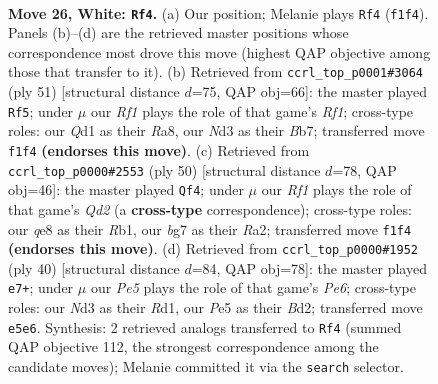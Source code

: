 \documentclass[11pt]{article}
\begin{document}
\clearpage

\begin{figure}[p]\centering
\begin{subfigure}{0.46\textwidth}\centering
\resizebox{\linewidth}{!}{%
\newchessgame
\chessboard[
  setfen={3rqr1k/6b1/1pn5/p1pBPpn1/2P4p/1P1N4/PB1P2K1/1R1Q1R2 w - - 4 26},
  showmover=false,
  pgfstyle=straightmove, color=movearrow, markmove={f1-f4}
]}
\caption{}
\end{subfigure}\hfill
\begin{subfigure}{0.46\textwidth}\centering
\resizebox{\linewidth}{!}{%
\newchessgame
\chessboard[
  setfen={r4r1k/1b2q2p/2pb2p1/3nN3/1p1PNP2/6Q1/1P1B3P/2R2RK1 b - - 2 26},
  showmover=false,
  pgfstyle=straightmove, color=movearrow, markmove={f8-f5}
]}
\caption{}
\end{subfigure}
\\[4pt]
\begin{subfigure}{0.46\textwidth}\centering
\resizebox{\linewidth}{!}{%
\newchessgame
\chessboard[
  setfen={r1rq2k1/5pp1/2bbpn1p/4B3/2PP4/p1N2P1P/R1BQ2P1/1R4K1 w - - 2 26},
  showmover=false,
  pgfstyle=straightmove, color=movearrow, markmove={d2-f4}
]}
\caption{}
\end{subfigure}\hfill
\begin{subfigure}{0.46\textwidth}\centering
\resizebox{\linewidth}{!}{%
\newchessgame
\chessboard[
  setfen={2qrr1k1/1b4p1/pp2Pn1p/2p1bQ2/P1B5/2N4P/1P1B1PP1/3R2K1 w - - 0 21},
  showmover=false,
  pgfstyle=straightmove, color=movearrow, markmove={e6-e7}
]}
\caption{}
\end{subfigure}
\caption{\textbf{Move 26, White: \texttt{Rf4}.} (a) Our position; Melanie plays \texttt{Rf4} (\texttt{f1f4}). Panels (b)--(d) are the retrieved master positions whose correspondence most drove this move (highest QAP objective among those that transfer to it). (b) Retrieved from \texttt{ccrl\_top\_p0001\#3064} (ply 51) [structural distance $d$=75, QAP obj=66]: the master played \texttt{Rf5}; under $\mu$ our \emph{Rf1} plays the role of that game's \emph{Rf1}; cross-type roles: our \emph{Q}d1 as their \emph{R}a8, our \emph{N}d3 as their \emph{B}b7; transferred move \texttt{f1f4} \textbf{(endorses this move)}. (c) Retrieved from \texttt{ccrl\_top\_p0000\#2553} (ply 50) [structural distance $d$=78, QAP obj=46]: the master played \texttt{Qf4}; under $\mu$ our \emph{Rf1} plays the role of that game's \emph{Qd2} (a \textbf{cross-type} correspondence); cross-type roles: our \emph{q}e8 as their \emph{R}b1, our \emph{b}g7 as their \emph{R}a2; transferred move \texttt{f1f4} \textbf{(endorses this move)}. (d) Retrieved from \texttt{ccrl\_top\_p0000\#1952} (ply 40) [structural distance $d$=84, QAP obj=78]: the master played \texttt{e7+}; under $\mu$ our \emph{Pe5} plays the role of that game's \emph{Pe6}; cross-type roles: our \emph{N}d3 as their \emph{R}d1, our \emph{P}e5 as their \emph{B}d2; transferred move \texttt{e5e6}. Synthesis: 2 retrieved analogs transferred to \texttt{Rf4} (summed QAP objective 112, the strongest correspondence among the candidate moves); Melanie committed it via the \texttt{search} selector.}
\label{fig:thought-m50}
\end{figure}
\end{document}
